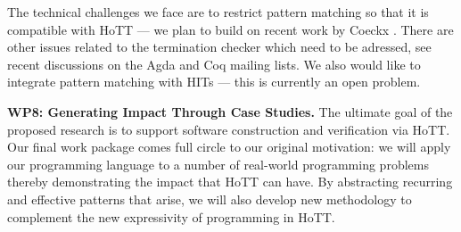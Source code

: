 \documentclass[a4paper,11pt]{article}
\begin{document}
The technical challenges we face are to restrict pattern matching so
that it is compatible with HoTT --- we plan to build on recent work
by Coeckx \cite{coeckx-without-k}. There are other issues
related to the termination checker which need to be adressed, 
see recent discussions on the Agda and Coq mailing lists.
We also would like to integrate pattern
matching with HITs --- this is currently an open problem. 







{\bf WP8: Generating Impact Through Case Studies.} The ultimate goal
of the proposed research is to support software construction and
verification via HoTT. Our final work package comes full circle to our
original motivation: we will apply our programming language to a
number of real-world programming problems thereby demonstrating the
impact that HoTT can have. By abstracting recurring and effective
patterns that arise, we will also develop new methodology to
complement the new expressivity of programming in HoTT.
\end{document}
